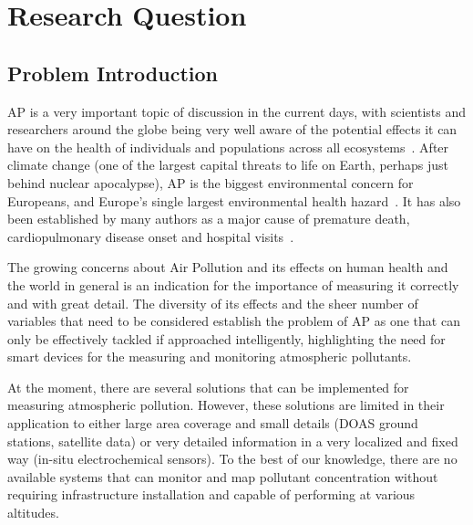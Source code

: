 \chapter{Research Question}
\label{cha:research_question}

\section{Problem Introduction}%
\label{sec:problem_introduction}


\gls{AP} is a very important topic of discussion in the current days,
with scientists and researchers around the globe being very well aware
of the potential effects it can have on the health of individuals and
populations across all ecosystems~\cite{Lovett2009}. After climate
change (one of the largest capital threats to life on Earth, perhaps
just behind nuclear apocalypse), \gls{AP} is the biggest environmental
concern for Europeans, and Europe's single largest environmental health
hazard~\cite{EEA2016}. It has also been established by many authors as a
major cause of premature death, cardiopulmonary disease onset and
hospital visits~\cite{Ghorani-Azam2016, EEA2007, EEA2016,
WorldHealthOrganisationEurope2004}.

The growing concerns about Air Pollution and its effects on human health
and the world in general is an indication for the importance of
measuring it correctly and with great detail. The diversity of its
effects and the sheer number of variables that need to be considered
establish the problem of \gls{AP} as one that can only be effectively
tackled if  approached intelligently, highlighting the need for smart
devices for the measuring and monitoring atmospheric pollutants.

At the moment, there are several solutions that can be implemented for
measuring atmospheric pollution. However, these solutions are limited in
their application to either large area coverage and small details (DOAS
ground stations, satellite data) or very detailed information in a very
localized and fixed way (in-situ electrochemical sensors). To the best
of our knowledge, there are no available systems that can monitor and
map pollutant concentration without requiring infrastructure
installation and capable of performing at various altitudes.

